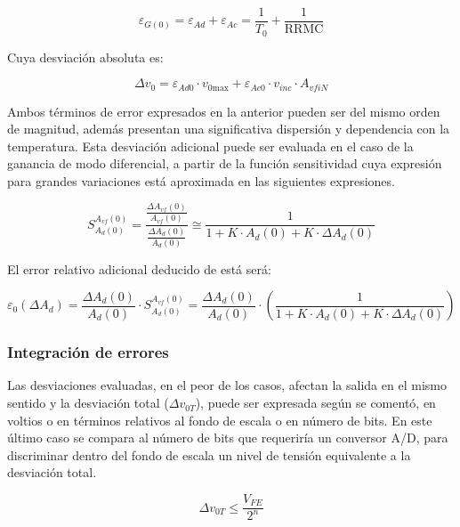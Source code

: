 \begin{equation} \tag{2.21}
\varepsilon_{G(0)} = \varepsilon_{Ad} + \varepsilon_{Ac} = \frac{1}{T_0} + \frac{1}{\text{RRMC}}
\end{equation}

Cuya desviación absoluta es:

\begin{equation} \tag{2.22}
\Delta v_0 = \varepsilon_{Ad0} \cdot v_{0\text{max}} + \varepsilon_{Ac0} \cdot v_{inc} \cdot A_{vfiN}
\end{equation}

Ambos términos de error expresados en la anterior pueden ser del mismo orden de magnitud, además presentan una significativa dispersión y dependencia con la temperatura. Esta desviación adicional puede ser evaluada en el caso de la ganancia de modo diferencial, a partir de la función sensitividad cuya expresión para grandes variaciones está aproximada en las siguientes expresiones.

\begin{equation} \tag{2.23}
S_{A_d(0)}^{A_{vf}(0)} = \frac{\frac{\Delta A_{vf}(0)}{A_{vf}(0)}}{\frac{\Delta A_d(0)}{A_d(0)}} \cong \frac{1}{1 + K \cdot A_d(0) + K \cdot \Delta A_d(0)}
\end{equation}

El error relativo adicional deducido de está será:

\begin{equation} \tag{2.24}
\varepsilon_0 (\Delta A_d) = \frac{\Delta A_d(0)}{A_d(0)} \cdot S_{A_d(0)}^{A_{vf}(0)} = \frac{\Delta A_d(0)}{A_d(0)} \cdot \left( \frac{1}{1 + K \cdot A_d(0) + K \cdot \Delta A_d(0)} \right)
\end{equation}
\subsubsection{Integración de errores}
\noindent Las desviaciones evaluadas, en el peor de los casos, afectan la salida en el mismo sentido y la desviación total ($\Delta v_{0T}$), puede ser expresada según se comentó, en voltios o en términos relativos al fondo de escala o en número de bits. En este último caso se compara al número de bits que requeriría un conversor A/D, para discriminar dentro del fondo de escala un nivel de tensión equivalente a la desviación total.

\begin{equation}
\Delta v_{0T} \leq \frac{V_{FE}}{2^n}
\end{equation}
